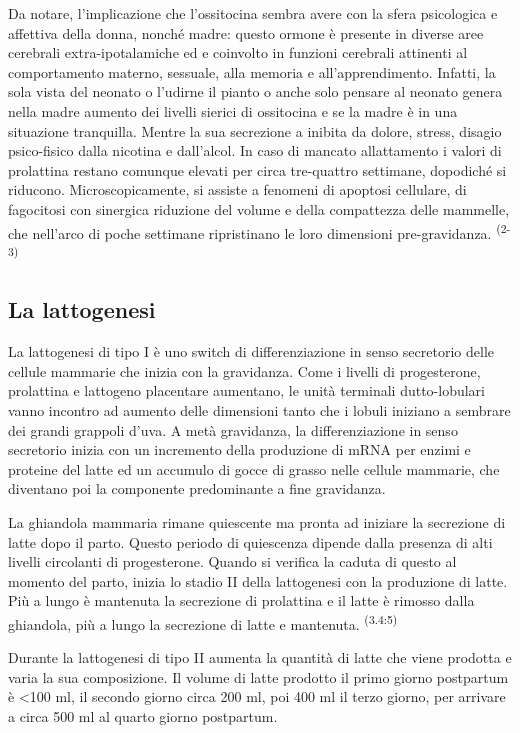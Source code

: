 \documentclass[]{article}
\begin{document}
Da notare, l'implicazione che l'ossitocina sembra avere con la sfera
psicologica e affettiva della donna, nonché madre: questo ormone è
presente in diverse aree cerebrali extra-ipotalamiche ed e coinvolto in
funzioni cerebrali attinenti al comportamento materno, sessuale, alla
memoria e all'apprendimento. Infatti, la sola vista del neonato o
l'udirne il pianto o anche solo pensare al neonato genera nella madre
aumento dei livelli sierici di ossitocina e se la madre è in una
situazione tranquilla. Mentre la sua secrezione a inibita da dolore,
stress, disagio psico-fisico dalla nicotina e dall'alcol. In caso di
mancato allattamento i valori di prolattina restano comunque elevati per
circa tre-quattro settimane, dopodiché si riducono. Microscopicamente,
si assiste a fenomeni di apoptosi cellulare, di fagocitosi con sinergica
riduzione del volume e della compattezza delle mammelle, che nell'arco
di poche settimane ripristinano le loro dimensioni pre-gravidanza.
\textsuperscript{(2-3) }

\hypertarget{la-lattogenesi}{%
\subsection{La lattogenesi}\label{la-lattogenesi}}

La {lattogenesi di tipo I} è uno switch di differenziazione in senso
secretorio delle cellule mammarie che inizia con la gravidanza. Come i
livelli di progesterone, prolattina e lattogeno placentare aumentano, le
unità terminali dutto-lobulari vanno incontro ad aumento delle
dimensioni tanto che i lobuli iniziano a sembrare dei grandi grappoli
d'uva. A metà gravidanza, la differenziazione in senso secretorio inizia
con un incremento della produzione di mRNA per enzimi e proteine del
latte ed un accumulo di gocce di grasso nelle cellule mammarie, che
diventano poi la componente predominante a fine gravidanza.

La ghiandola mammaria rimane quiescente ma pronta ad iniziare la
secrezione di latte dopo il parto. Questo periodo di quiescenza dipende
dalla presenza di alti livelli circolanti di progesterone. Quando si
verifica la caduta di questo al momento del parto, inizia lo stadio II
della lattogenesi con la produzione di latte. Più a lungo è mantenuta la
secrezione di prolattina e il latte è rimosso dalla ghiandola, più a
lungo la secrezione di latte e mantenuta. \textsuperscript{(3.4:5) }

Durante la {lattogenesi di tipo II} aumenta la quantità di latte che
viene prodotta e varia la sua composizione. Il volume di latte prodotto
il primo giorno postpartum è \textless{}100 ml, il secondo giorno circa
200 ml, poi 400 ml il terzo giorno, per arrivare a circa 500 ml al
quarto giorno postpartum.
\end{document}
